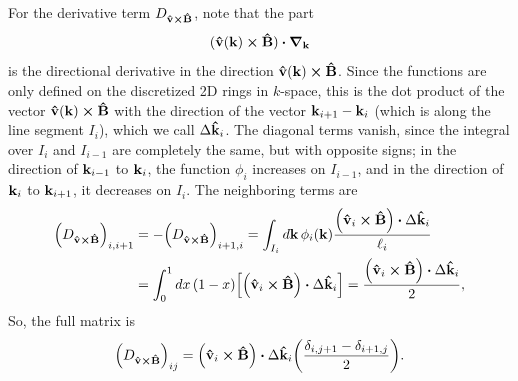 \documentclass[12pt]{article}
\begin{document}
For the derivative term $D_{\vu{v}\cross\vu{B}}$, note that the part
\begin{equation}
    (\vu{v}(\vb{k})\cross\vu{B})\vdot\grad_{\vb{k}}
\end{equation}
is the directional derivative in the direction $\vu{v}(\vb{k})\cross\vu{B}$. Since the functions are
only defined on the discretized 2D rings in $k$-space, this is the dot product of the vector
$\vu{v}(\vb{k})\cross\vu{B}$ with the direction of the vector $\vb{k}_{i+1} - \vb{k}_i$ (which is
along the line segment $I_i$), which we call $\Delta\vu{k}_i$. The diagonal terms vanish, since the
integral over $I_i$ and $I_{i-1}$ are completely the same, but with opposite signs; in the
direction of $\vb{k}_{i-1}$ to $\vb{k}_i$, the function $\phi_i$ increases on $I_{i-1}$, and in the
direction of $\vb{k}_i$ to $\vb{k}_{i+1}$, it decreases on $I_i$. The neighboring terms are
\begin{equation}
\begin{aligned}
    \qty(D_{\vu{v}\cross\vu{B}})_{i,i+1} &= -\qty(D_{\vu{v}\cross\vu{B}})_{i+1,i}
        = \int_{I_i} \dd{\vb{k}} \phi_i(\vb{k})
        \frac{\qty(\vu{v}_i\cross\vu{B})\vdot\Delta\vu{k}_i}{\ell_i} \\
    &= \int_0^1 \dd{x} (1-x) \qty[\qty(\vu{v}_i\cross\vu{B})\vdot\Delta\vu{k}_i]
    = \frac{\qty(\vu{v}_i\cross\vu{B})\vdot\Delta\vu{k}_i}{2},
\end{aligned}
\end{equation}
So, the full matrix is
\begin{equation}
    \qty(D_{\vu{v}\cross\vu{B}})_{ij} = \qty(\vu{v}_i\cross\vu{B})\vdot\Delta\vu{k}_i
    \qty(\frac{\delta_{i,j+1} - \delta_{i+1,j}}{2}).
\end{equation}
\end{document}
